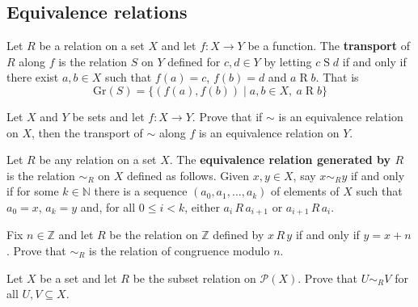 
\subsection*{Equivalence relations}

\begin{definition}
\label{defTransportOfRelation}
Let $R$ be a relation on a set $X$ and let $f : X \to Y$ be a function. The \textbf{transport} of $R$ along $f$ is the relation $S$ on $Y$ defined for $c,d \in Y$ by letting $c \mathrel{S} d$ if and only if there exist $a,b \in X$ such that $f(a)=c$, $f(b)=d$ and $a \mathrel{R} b$. That is
\[ \mathrm{Gr}(S) = \{ (f(a), f(b)) \mid a,b \in X,~ a \mathrel{R} b \} \]
\end{definition}

\begin{chapex}
Let $X$ and $Y$ be sets and let $f : X \to Y$. Prove that if $\sim$ is an equivalence relation on $X$, then the transport of $\sim$ along $f$ is an equivalence relation on $Y$.
\end{chapex}

\begin{definition}
\label{defEquivalenceRelationGeneratedByRelation}
Let $R$ be any relation on a set $X$. The \textbf{equivalence relation generated by $R$} is the relation ${\sim}_R$ on $X$ defined as follows. Given $x,y \in X$, say $x \sim_R y$ if and only if for some $k \in \mathbb{N}$ there is a sequence $(a_0, a_1, \dots, a_k)$ of elements of $X$ such that $a_0=x$, $a_k=y$ and, for all $0 \le i < k$, either $a_i\,R\,a_{i+1}$ or $a_{i+1}\,R\,a_i$.
\end{definition}

\begin{chapex}
\label{cqEquivalenceRelationGeneratedByRelationBegin}
Fix $n \in \mathbb{Z}$ and let $R$ be the relation on $\mathbb{Z}$ defined by $x\,R\,y$ if and only if $y=x+n$. Prove that ${\sim}_R$ is the relation of congruence modulo $n$.
\end{chapex}

\begin{chapex}
Let $X$ be a set and let $R$ be the subset relation on $\mathcal{P}(X)$. Prove that $U \mathrel{{\sim}_R} V$ for all $U, V \subseteq X$.
\end{chapex}

